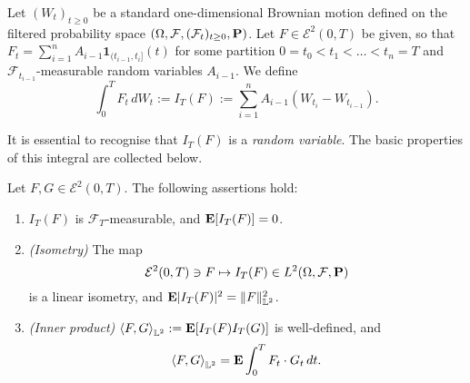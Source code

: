 \begin{definition}
    Let $(W_t)_{t\ge 0}$ be a standard one-dimensional Brownian motion defined on the filtered probability space $(\Omega,\mathcal{F},(\mathcal{F}_t)_{t\ge 0},\mathbf{P})$. Let $F\in\mathcal{E}^2(0,T)$ be given, so that $F_t=\sum_{i=1}^n A_{i-1}\mathbf{1}_{(t_{i-1},t_i]}(t)$ for some partition $0=t_0<t_1<\ldots <t_n=T$ and $\mathcal{F}_{t_{i-1}}$-measurable random variables $A_{i-1}$. We define
    \begin{equation}
    \label{eq:ito-elementary}
        \int_0^T F_t\, dW_t := I_T(F) := \sum_{i=1}^n A_{i-1}(W_{t_i}-W_{t_{i-1}}).
    \end{equation}
\end{definition}

It is essential to recognise that $I_T(F)$ is a \emph{random variable}. The basic properties of this integral are collected below.
\begin{lemma}
\label{lem:elem-integral}
    Let $F, G\in\mathcal{E}^2(0,T)$. The following assertions hold:
    \begin{enumerate}[\upshape (i)]
        \item $I_T(F)$ is $\mathcal{F}_T$-measurable, and $\mathbf{E}[I_T(F)]=0$.
        \item \emph{(Isometry)} The map
        \begin{equation*}
            \mathcal{E}^2(0,T)\ni F \mapsto I_T(F) \in L^2(\Omega,\mathcal{F},\mathbf{P})
        \end{equation*}
        is a linear isometry, and $\mathbf{E}|I_T(F)|^2 = \|F\|^2_{\mathbb{L}^2}$.
        \item \emph{(Inner product)} $\braket{F,G}_{\mathbb{L}^2}:= \mathbf{E}[I_T(F) I_T(G)]$ is well-defined, and
        \begin{equation*}
            \braket{F,G}_{\mathbb{L}^2} = \mathbf{E}\int_0^T F_t\cdot G_t \,dt.
        \end{equation*}
    \end{enumerate}
\end{lemma}

